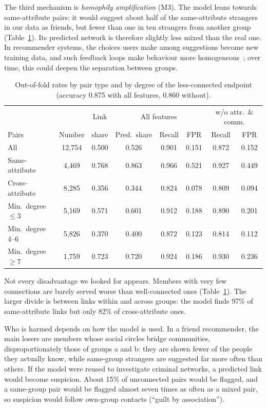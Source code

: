 \documentclass[runningheads]{llncs}
\begin{document}
The third mechanism is \emph{homophily amplification} (M3). The model leans towards same-attribute pairs: it would suggest about half of the same-attribute strangers in our data as friends, but fewer than one in ten strangers from another group (Table~\ref{tab:segments}). Its predicted network is therefore slightly less mixed than the real one. In recommender systems, the choices users make among suggestions become new training data, and such feedback loops make behaviour more homogeneous~\cite{chaney2018}; over time, this could deepen the separation between groups.

\begin{table}[t]
\centering
\small
\caption{Out-of-fold rates by pair type and by degree of the less-connected endpoint (accuracy 0.875 with all features, 0.860 without).}
\label{tab:segments}
\begin{tabular}{lcc|ccc|cc}
\hline
 & & Link & \multicolumn{3}{c|}{All features} & \multicolumn{2}{c}{w/o attr.\ \& comm.} \\
Pairs & Number & share & Pred.\ share & Recall & FPR & Recall & FPR \\
\hline
All                & 12{,}754 & 0.500 & 0.526 & 0.901 & 0.151 & 0.872 & 0.152 \\
Same-attribute     & 4{,}469  & 0.768 & 0.863 & 0.966 & 0.521 & 0.927 & 0.449 \\
Cross-attribute    & 8{,}285  & 0.356 & 0.344 & 0.824 & 0.078 & 0.809 & 0.094 \\
Min.\ degree $\leq 3$ & 5{,}169 & 0.571 & 0.601 & 0.912 & 0.188 & 0.890 & 0.201 \\
Min.\ degree 4--6  & 5{,}826  & 0.370 & 0.400 & 0.872 & 0.123 & 0.814 & 0.112 \\
Min.\ degree $\geq 7$ & 1{,}759 & 0.723 & 0.720 & 0.924 & 0.186 & 0.930 & 0.236 \\
\hline
\end{tabular}
\end{table}

Not every disadvantage we looked for appears. Members with very few connections are barely served worse than well-connected ones (Table~\ref{tab:segments}). The larger divide is between links within and across groups: the model finds 97\% of same-attribute links but only 82\% of cross-attribute ones.

Who is harmed depends on how the model is used. In a friend recommender, the main losers are members whose social circles bridge communities, disproportionately those of groups a and b: they are shown fewer of the people they actually know, while same-group strangers are suggested far more often than others. If the model were reused to investigate criminal networks, a predicted link would become suspicion. About 15\% of unconnected pairs would be flagged, and a same-group pair would be flagged almost seven times as often as a mixed pair, so suspicion would follow own-group contacts (``guilt by association'').
\end{document}

